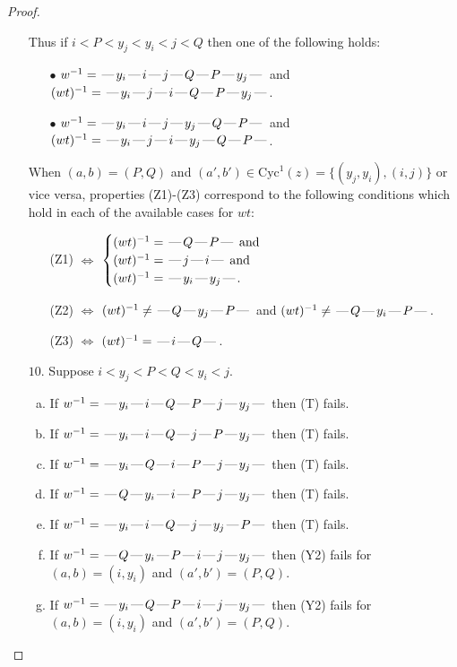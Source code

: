 \documentclass[10pt]{article}
\theoremstyle{definition}
\theoremstyle{definition}
\def\dash{\text{\hspace{0.5mm}---\hspace{0.5mm}}}
\def\Cyc{\mathrm{Cyc}}
\begin{document}
\begin{proof}
\begin{enumerate}
\begin{enumerate}[(a)]
\end{enumerate}
Thus if $i < P < y_j < y_i < j < Q$ then one of the following holds:
\begin{enumerate}
\item[$\bullet$] $w^{-1} = \dash y_i\dash i\dash j\dash Q\dash P\dash y_j\dash $ and $(wt)^{-1} = \dash y_i\dash j\dash i\dash Q\dash P\dash y_j\dash $.
\item[$\bullet$] $w^{-1} = \dash y_i\dash i\dash j\dash y_j\dash Q\dash P\dash $ and $(wt)^{-1} = \dash y_i\dash j\dash i\dash y_j\dash Q\dash P\dash $.
\end{enumerate}
When $(a,b)= (P,Q)$ and $(a',b')\in \Cyc^1(z)=\{(y_j,y_i),(i,j)\}$ or vice versa,
properties (Z1)-(Z3) correspond to the following conditions which
hold in each of the available cases for $wt$:
\begin{enumerate}
\item[](Z1) $\Leftrightarrow$ $\begin{cases}\text{$(wt)^{-1} = \dash Q \dash P \dash$}\text{ and }\\
\text{$(wt)^{-1} = \dash j \dash i \dash$}\text{ and }\\
\text{$(wt)^{-1} = \dash y_i \dash y_j \dash$}.\end{cases}$
\item[](Z2) $\Leftrightarrow$ $(wt)^{-1} \neq \dash Q \dash y_j \dash P \dash$ and $(wt)^{-1}\neq \dash Q \dash y_i \dash P \dash$.
\item[](Z3) $\Leftrightarrow$ $(wt)^{-1} = \dash i \dash Q \dash$.
\end{enumerate}
\item[$10$.] Suppose $i < y_j < P < Q < y_i < j$.
\begin{enumerate}[(a)]
\item If $w^{-1} = \dash y_i\dash i\dash Q\dash P\dash j\dash y_j\dash $ then (T) fails.
\item If $w^{-1} = \dash y_i\dash i\dash Q\dash j\dash P\dash y_j\dash $ then (T) fails.
\item If $w^{-1} = \dash y_i\dash Q\dash i\dash P\dash j\dash y_j\dash $ then (T) fails.
\item If $w^{-1} = \dash Q\dash y_i\dash i\dash P\dash j\dash y_j\dash $ then (T) fails.
\item If $w^{-1} = \dash y_i\dash i\dash Q\dash j\dash y_j\dash P\dash $ then (T) fails.
\item If $w^{-1} = \dash Q\dash y_i\dash P\dash i\dash j\dash y_j\dash $ then (Y2) fails for $(a,b)=(i,y_i)$ and $(a',b')=(P,Q)$.
\item If $w^{-1} = \dash y_i\dash Q\dash P\dash i\dash j\dash y_j\dash $ then (Y2) fails for $(a,b)=(i,y_i)$ and $(a',b')=(P,Q)$.

\end{enumerate}
\end{enumerate}
\end{proof}
\end{document}

